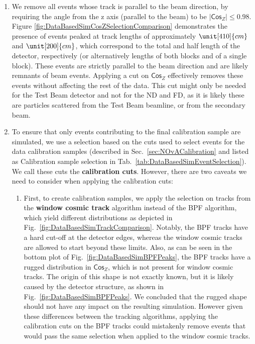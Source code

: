 \begin{enumerate}
\item We remove all events whose track is parallel to the beam direction, by requiring the angle from the z axis (parallel to the beam) to be $|\textsf{Cos}_Z|\leq 0.98$. Figure \ref{fig:DataBasedSimCosZSelectionComparison} demonstrates the presence of events peaked at track lengths of approximately $\unit[410]{cm}$ and $\unit[200]{cm}$, which correspond to the total and half length of the detector, respectively (or alternatively lengths of both blocks and of a single block). These events are strictly parallel to the beam direction and are likely remnants of beam events. Applying a cut on $\textsf{Cos}_Z$ effectively removes these events without affecting the rest of the data. This cut might only be needed for the Test Beam detector and not for the \gls{ND} and \gls{FD}, as it is likely these are particles scattered from the Test Beam beamline, or from the secondary beam.

\item To ensure that only events contributing to the final calibration sample are simulated, we use a selection based on the cuts used to select events for the data calibration samples (described in Sec.~\ref{sec:NOvACalibration} and listed as Calibration sample selection in Tab.~\ref{tab:DataBasedSimEventSelection}). We call these cuts the \textbf{calibration cuts}. However, there are two caveats we need to consider when applying the calibration cuts:
\begin{enumerate}
\item First, to create calibration samples, we apply the selection on tracks from the \textbf{window cosmic track} algorithm instead of the \gls{BPF} algorithm, which yield different distributions as depicted in Fig.~\ref{fig:DataBasedSimTrackComparison}. Notably, the \gls{BPF} tracks have a hard cut-off at the detector edges, whereas the window cosmic tracks are allowed to start beyond these limits. Also, as can be seen in the bottom plot of Fig.~\ref{fig:DataBasedSimBPFPeaks}, the \gls{BPF} tracks have a rugged distribution in $\textsf{Cos}_Z$, which is not present for window cosmic tracks. The origin of this shape is not exactly known, but it is likely caused by the detector structure, as shown in Fig.~\ref{fig:DataBasedSimBPFPeaks}. We concluded that the rugged shape should not have any impact on the resulting simulation. However given these differences between the tracking algorithms, applying the calibration cuts on the \gls{BPF} tracks could mistakenly remove events that would pass the same selection when applied to the window cosmic tracks.


\end{enumerate}
\end{enumerate}
